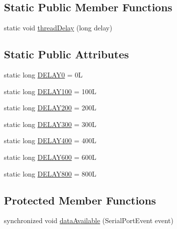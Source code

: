 \subsection*{Static Public Member Functions}
\begin{DoxyCompactItemize}
\item 
static void \hyperlink{classcom_1_1eneri_1_1scorpio__metertool_1_1hardwarelayer_1_1_port_comunication_a098af3f8925a2dc6acd6b448b9356e99}{thread\+Delay} (long delay)
\end{DoxyCompactItemize}
\subsection*{Static Public Attributes}
\begin{DoxyCompactItemize}
\item 
static long \hyperlink{classcom_1_1eneri_1_1scorpio__metertool_1_1hardwarelayer_1_1_port_comunication_ac4017468270db06b5e3a129defc738f5}{D\+E\+L\+A\+Y0} = 0L
\item 
static long \hyperlink{classcom_1_1eneri_1_1scorpio__metertool_1_1hardwarelayer_1_1_port_comunication_a48b9e6d73a66ca11eedd2c418a702f03}{D\+E\+L\+A\+Y100} = 100L
\item 
static long \hyperlink{classcom_1_1eneri_1_1scorpio__metertool_1_1hardwarelayer_1_1_port_comunication_a4fcc9598d4a178c7da2f45b9cfb33876}{D\+E\+L\+A\+Y200} = 200L
\item 
static long \hyperlink{classcom_1_1eneri_1_1scorpio__metertool_1_1hardwarelayer_1_1_port_comunication_ad0ec0e2ee14778e70f62aec6044ec7f0}{D\+E\+L\+A\+Y300} = 300L
\item 
static long \hyperlink{classcom_1_1eneri_1_1scorpio__metertool_1_1hardwarelayer_1_1_port_comunication_a7e83d8f788360f42c9fd4ee610e6066e}{D\+E\+L\+A\+Y400} = 400L
\item 
static long \hyperlink{classcom_1_1eneri_1_1scorpio__metertool_1_1hardwarelayer_1_1_port_comunication_ab81bee80f82e1be4d89790536f8f125d}{D\+E\+L\+A\+Y600} = 600L
\item 
static long \hyperlink{classcom_1_1eneri_1_1scorpio__metertool_1_1hardwarelayer_1_1_port_comunication_acc8b5901450eaf3703a02c7b7e8bc203}{D\+E\+L\+A\+Y800} = 800L
\end{DoxyCompactItemize}
\subsection*{Protected Member Functions}
\begin{DoxyCompactItemize}
\item 
synchronized void \hyperlink{classcom_1_1eneri_1_1scorpio__metertool_1_1hardwarelayer_1_1_port_comunication_ae64b5c65b24d9fcea59eb825d07dc4ed}{data\+Available} (Serial\+Port\+Event event)
\end{DoxyCompactItemize}


